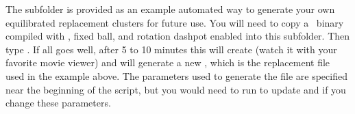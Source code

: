 The  subfolder is provided as an example automated way to
generate your own equilibrated replacement clusters for future use.
You will need to copy a \pkd\ binary compiled with , fixed
ball, and rotation dashpot enabled into this subfolder.  Then type
.  If all goes well, after 5 to 10 minutes this
will create  (watch it with your favorite movie
viewer) and will generate a new , which is the
replacement file used in the example above.  The 
parameters used to generate the file are specified near the beginning
of the  script, but you would need to run
 to update  and  if you change
these parameters.


